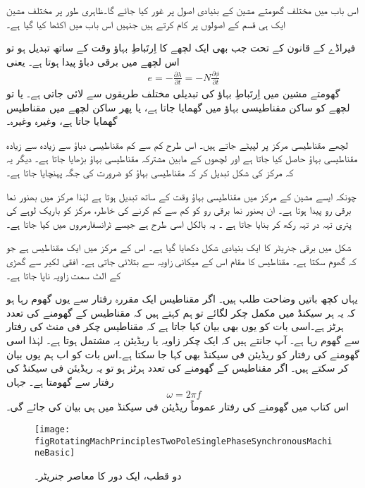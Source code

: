 اس باب میں مختلف گھومتے مشین کے بنیادی اصول پر غور کیا جائے گا۔ظاہری طور پر مختلف مشین ایک ہی قسم کے اصولوں پر کام کرتے ہیں جنہیں اس باب میں اکٹھا کیا گیا ہے۔

فیراڈے کے قانون کے تحت جب بھی ایک لچھے کا اِرتَباطِ بہاؤ   وقت کے ساتھ تبدیل ہو تو اس لچھے میں برقی دباؤ پیدا ہوتا ہے۔ یعنی
\begin{align}
e=-\frac{\partial \lambda}{\partial t}=-N \frac{\partial \phi}{\partial t}
\end{align}
گھومتے مشین میں اِرتَباطِ بہاؤ کی تبدیلی مختلف طریقوں سے لائی جاتی ہے۔ یا تو لچھے کو ساکن مقناطیسی بہاؤ میں گھمایا جاتا ہے، یا پھر ساکن لچھے میں مقناطیس گھمایا جاتا ہے، وغیرہ وغیرہ۔

لچھے مقناطیسی مرکز  پر لپیٹے جاتے ہیں۔ اس طرح کم سے کم مقناطیسی دباؤ سے زیادہ سے زیادہ مقناطیسی بہاؤ حاصل کیا جاتا ہے اور لچھوں کے مابین مشترکہ مقناطیسی بہاؤ بڑھایا جاتا ہے۔ دیگر یہ کہ مرکز کی شکل تبدیل کر کہ مقناطیسی بہاؤ کو ضرورت کی جگہ پہنچایا جاتا ہے۔

چونکہ ایسے مشین کے مرکز میں مقناطیسی بہاؤ وقت کے ساتھ تبدیل ہوتا ہے لہٰذا مرکز میں بھنور نما برقی رو پیدا ہوتا ہے۔ ان بھنور نما برقی رو کو کم سے کم کرنے کی خاطر، مرکز کو باریک لوہے کی پتری تہہ در تہہ رکھ کر بنایا جاتا ہے ۔ یہ بالکل اسی طرح ہے جیسے ٹرانسفارمروں میں کیا جاتا ہے۔

شکل   میں برقی جنریٹر کا ایک بنیادی شکل دکھایا گیا ہے۔ اس کے مرکز میں ایک مقناطیس ہے جو کہ گھوم سکتا ہے۔ مقناطیس کا مقام اس کے میکانی زاویہ  سے بتلائی جاتی ہے۔ افقی لکیر سے گھڑی کے الٹ سمت زاویہ  ناپا جاتا ہے۔

یہاں کچھ باتیں وضاحت طلب ہیں۔ اگر مقناطیس ایک مقررہ رفتار سے یوں گھوم رہا ہو کہ یہ ہر سیکنڈ میں    مکمل چکر لگائے تو ہم کہتے ہیں کہ مقناطیس کے گھومنے کی تعدد   ہرٹز ہے۔اسی بات کو یوں بھی بیان کیا جاتا ہے کہ مقناطیس  چکر فی منٹ کی رفتار سے گھوم رہا ہے۔ آپ جانتے ہیں کہ ایک چکر  زاویہ یا  ریڈیئن  پہ مشتمل ہوتا ہے۔ لہٰذا اسی گھومنے کی رفتار کو  ریڈیئن فی سیکنڈ بھی کہا جا سکتا ہے۔اس بات کو اب ہم یوں بیان کر سکتے ہیں۔ اگر مقناطیس کے گھومنے کی تعدد  ہرٹز ہو تو یہ  ریڈیئن فی سیکنڈ کی رفتار سے گھومتا ہے۔ جہاں
\begin{align}
\omega =2\pi f
\end{align}
اس کتاب میں گھومنے کی رفتار عموماً ریڈیئن فی سیکنڈ میں ہی بیان کی جائے گی۔
\begin{figure}
\centering
\texttt{[image: figRotatingMachPrinciplesTwoPoleSinglePhaseSynchronousMachineBasic]}
\caption{دو قطب، ایک دور کا معاصر جنریٹر۔}
\label{شکل_گھومتے_مشین_دو_قطب_ایک_دور_معاصر_بنیادی_شکل}
\end{figure}

